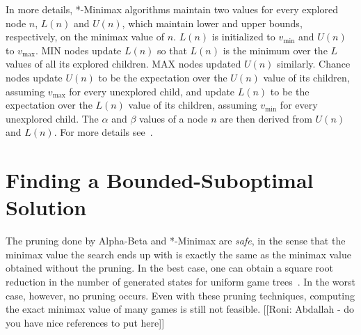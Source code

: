 \documentclass[letterpaper]{article} %
\newcommand{\pess}{\mathit{L}}
\newcommand{\opti}{\mathit{U}}
\newcommand{\vmax}{v_{\text{max}}}
\newcommand{\vmin}{v_{\text{min}}}
\begin{document}
In more details, *-Minimax algorithms maintain two values for every explored node $n$, $\pess(n)$ and $\opti(n)$, which maintain lower and upper bounds, respectively, on the minimax value of $n$. 
$\pess(n)$ is initialized to $\vmin$ and $\opti(n)$ to $\vmax$. 
MIN nodes update $\pess(n)$ so that $\pess(n)$ is the minimum over the $\pess$ values of all its explored children. MAX nodes updated $\opti(n)$ similarly. Chance nodes update $\opti(n)$ to be the expectation over the $\opti(n)$ value of its children, assuming $\vmax{}$ for every unexplored child, and update $\pess(n)$ to be the expectation over the $\pess(n)$ value of its children, assuming $\vmin{}$ for every unexplored child. 
The $\alpha$ and $\beta$ values of a node $n$ are then derived from $\opti(n)$ and $\pess(n)$. For more details see~\cite{ballard1983minimax}. 




\section{Finding a Bounded-Suboptimal Solution}

The pruning done by Alpha-Beta and *-Minimax are \emph{safe}, in the sense that the minimax value the search ends up with is exactly the same as the minimax value obtained without the pruning. In the best case, one can obtain a square root reduction in the number of generated states for uniform game trees~\cite{knuth1975analysis,ballard1983minimax}. In the worst case, however, no pruning occurs. Even with these pruning techniques, computing the exact minimax value of many games is still not feasible. [[Roni: Abdallah - do you have nice references to put here]]  
\end{document}

